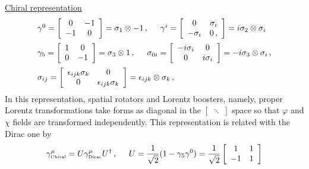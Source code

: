\noindent
\underline{Chiral representation}\\
\begin{eqnarray}
\begin{array}{l}
\gamma^0
=
\left[
\begin{array}{cc}
0 & -1 \\ -1 & 0
\end{array}
\right]
= \sigma_1 \otimes -1
\,,
\hspace{5mm}
\gamma^i
=
\left[
\begin{array}{cc}
0  & \sigma_i \\  -\sigma_i & 0\,,
\end{array}
\right]
=
i\sigma_2 \otimes \sigma_i
\vspace{2mm}
\\ %
\gamma_5
=
\left[
\begin{array}{cc}
1 & 0 \\ 0 & -1
\end{array}
\right]
= \sigma_3 \otimes 1
\,,
\hspace{5mm}
\sigma_{0i}
=
\left[
\begin{array}{cc}
-i\sigma_i & 0 \\  0 & i\sigma_i
\end{array}
\right]
=
-i\sigma_3 \otimes \sigma_i\,,
\vspace{2mm}
\\ %
\sigma_{ij}
=
\left[
\begin{array}{cc}
\epsilon_{ijk}\sigma_k & 0 \\  0 & \epsilon_{ijk}\sigma_k
\end{array}
\right]
=
\epsilon_{ijk} \otimes \sigma_k\,,
\end{array}
\end{eqnarray}
In this representation, spatial rotators and Lorentz boosters, namely, proper Lorentz transformations
take forms as diagonal in the $\left[\;\ddots\;\right]$ space so that $\varphi$ and $\chi$ fields
are transformed independently. This representation is related with the Dirac one by
\begin{eqnarray}
\gamma^\mu_{\mbox{\tiny Chiral}}
= U \gamma^\mu_{\mbox{\tiny Dirac}} U^{\dagger}\,,
\hspace{5mm}
U = 
\frac{1}{\sqrt{2}}
(1 - \gamma_5 \gamma^0)
=
\frac{1}{\sqrt{2}}
\left[
\begin{array}{cc}
1 & 1 \\
-1 & 1
\end{array}
\right]
\end{eqnarray}\\



